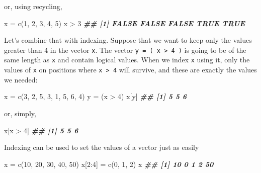 \documentclass[
]{book}
\newenvironment{Shaded}{\begin{snugshade}}{\end{snugshade}}
\newcommand{\DecValTok}[1]{\textcolor[rgb]{0.00,0.00,0.81}{#1}}
\newcommand{\DocumentationTok}[1]{\textcolor[rgb]{0.56,0.35,0.01}{\textbf{\textit{#1}}}}
\newcommand{\FunctionTok}[1]{\textcolor[rgb]{0.00,0.00,0.00}{#1}}
\newcommand{\NormalTok}[1]{#1}
\newcommand{\OtherTok}[1]{\textcolor[rgb]{0.56,0.35,0.01}{#1}}
\newcommand{\SpecialCharTok}[1]{\textcolor[rgb]{0.00,0.00,0.00}{#1}}
\theoremstyle{definition}
\theoremstyle{definition}
\theoremstyle{definition}
\theoremstyle{definition}
\theoremstyle{remark}
\begin{document}
or, using recycling,

\begin{Shaded}
\begin{Highlighting}[]
\NormalTok{x }\OtherTok{=} \FunctionTok{c}\NormalTok{(}\DecValTok{1}\NormalTok{, }\DecValTok{2}\NormalTok{, }\DecValTok{3}\NormalTok{, }\DecValTok{4}\NormalTok{, }\DecValTok{5}\NormalTok{)}
\NormalTok{x }\SpecialCharTok{\textgreater{}} \DecValTok{3}
\DocumentationTok{\#\# [1] FALSE FALSE FALSE  TRUE  TRUE}
\end{Highlighting}
\end{Shaded}

Let's combine that with indexing. Suppose that we want to keep only the values greater than 4 in the vector \texttt{x}. The vector \texttt{y\ =\ (\ x\ \textgreater{}\ 4\ )} is going to be of the same length as \texttt{x} and contain logical values.
When we index \texttt{x} using it, only the values of \texttt{x} on positions where \texttt{x\ \textgreater{}\ 4} will survive, and these are exactly the values we needed:

\begin{Shaded}
\begin{Highlighting}[]
\NormalTok{x }\OtherTok{=} \FunctionTok{c}\NormalTok{(}\DecValTok{3}\NormalTok{, }\DecValTok{2}\NormalTok{, }\DecValTok{5}\NormalTok{, }\DecValTok{3}\NormalTok{, }\DecValTok{1}\NormalTok{, }\DecValTok{5}\NormalTok{, }\DecValTok{6}\NormalTok{, }\DecValTok{4}\NormalTok{)}
\NormalTok{y }\OtherTok{=}\NormalTok{ (x }\SpecialCharTok{\textgreater{}} \DecValTok{4}\NormalTok{)}
\NormalTok{x[y]}
\DocumentationTok{\#\# [1] 5 5 6}
\end{Highlighting}
\end{Shaded}

or, simply,

\begin{Shaded}
\begin{Highlighting}[]
\NormalTok{x[x }\SpecialCharTok{\textgreater{}} \DecValTok{4}\NormalTok{]}
\DocumentationTok{\#\# [1] 5 5 6}
\end{Highlighting}
\end{Shaded}

Indexing can be used to set the values of a vector just as easily

\begin{Shaded}
\begin{Highlighting}[]
\NormalTok{x }\OtherTok{=} \FunctionTok{c}\NormalTok{(}\DecValTok{10}\NormalTok{, }\DecValTok{20}\NormalTok{, }\DecValTok{30}\NormalTok{, }\DecValTok{40}\NormalTok{, }\DecValTok{50}\NormalTok{)}
\NormalTok{x[}\DecValTok{2}\SpecialCharTok{:}\DecValTok{4}\NormalTok{] }\OtherTok{=} \FunctionTok{c}\NormalTok{(}\DecValTok{0}\NormalTok{, }\DecValTok{1}\NormalTok{, }\DecValTok{2}\NormalTok{)}
\NormalTok{x}
\DocumentationTok{\#\# [1] 10  0  1  2 50}
\end{Highlighting}
\end{Shaded}
\end{document}
